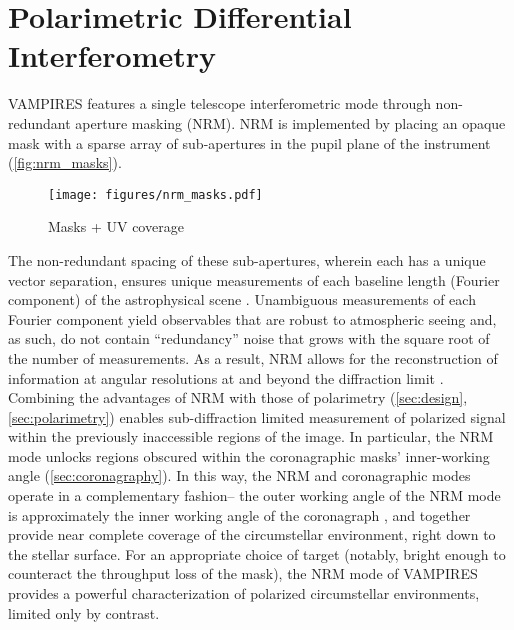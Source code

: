 \section{Polarimetric Differential Interferometry}\label{sec:interferometry}


 
 

VAMPIRES features a single telescope interferometric mode through non-redundant aperture masking (NRM). NRM is implemented by placing an opaque mask with a sparse array of sub-apertures in the pupil plane of the instrument (\autoref{fig:nrm_masks}).


\begin{figure*}[t]
\centering
\texttt{[image: figures/nrm\_masks.pdf]}
    \caption{Masks + UV coverage\label{fig:nrm_masks}}
\end{figure*}

The non-redundant spacing of these sub-apertures, wherein each has a unique vector separation, ensures unique measurements of each baseline length (Fourier component) of the astrophysical scene \citep{tuthill_aperture_2000}. Unambiguous measurements of each Fourier component yield observables that are robust to atmospheric seeing and, as such, do not contain ``redundancy'' noise that grows with the square root of the number of measurements. As a result, NRM allows for the reconstruction of information at angular resolutions at and beyond the diffraction limit \citep{labeyrie_introduction_2014}. Combining the advantages of NRM with those of polarimetry (\autoref{sec:design}, \autoref{sec:polarimetry}) enables sub-diffraction limited measurement of polarized signal within the previously inaccessible regions of the image. In particular, the NRM mode unlocks regions obscured within the coronagraphic masks' inner-working angle (\autoref{sec:coronagraphy}). In this way, the NRM and coronagraphic modes operate in a complementary fashion-- the outer working angle of the NRM mode is approximately the inner working angle of the coronagraph \citep{norris_vampires_2015}, and together provide near complete coverage of the circumstellar environment, right down to the stellar surface. For an appropriate choice of target (notably, bright enough to counteract the throughput loss of the mask), the NRM mode of VAMPIRES provides a powerful characterization of polarized circumstellar environments, limited only by contrast. 


